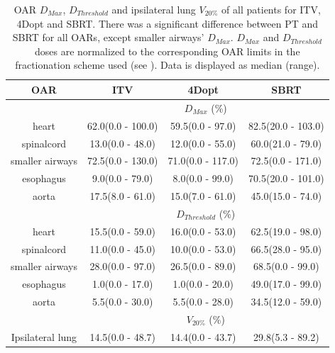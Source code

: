 \begin{table}[H]
	\centering
	\caption{OAR $D_{Max}$, $D_{Threshold}$ and ipsilateral lung $V_{20\%}$ of all patients for ITV, 4Dopt and SBRT. There was a significant difference between PT and SBRT for all OARs, except
	smaller airways' $D_{Max}$. $D_{Max}$ and $D_{Threshold}$ doses are normalized to the corresponding OAR limits in the fractionation scheme used (see \cite{Benedict2010}). 
	Data is displayed as median (range).}
	\begin{tabular}{c|c|c|c}
		\hline\hline
		 
		OAR &  ITV & 4Dopt & SBRT \\
		\hline
		& \multicolumn{3}{c}{$D_{Max}$ (\%)}  \\
		\hline
heart        & 62.0(0.0 - 100.0) & 59.5(0.0 - 97.0) & 82.5(20.0 - 103.0)\\ 
spinalcord    & 13.0(0.0 - 48.0) & 12.0(0.0 - 55.0) & 60.0(21.0 - 79.0)\\ 
smaller airways & 72.5(0.0 - 130.0) & 71.0(0.0 - 117.0) & 72.5(0.0 - 171.0)\\ 
esophagus      & 9.0(0.0 - 79.0) & 8.0(0.0 - 99.0) & 70.5(20.0 - 101.0)\\ 
aorta         & 17.5(8.0 - 61.0) & 15.0(7.0 - 61.0) & 45.0(15.0 - 74.0)\\ 
\hline\hline
& \multicolumn{3}{c}{$D_{Threshold}$ (\%)} \\
\hline
heart & 15.5(0.0 - 59.0) & 16.0(0.0 - 53.0) & 62.5(19.0 - 98.0)\\ 
spinalcord & 11.0(0.0 - 45.0) & 10.0(0.0 - 53.0) & 66.5(28.0 - 95.0)\\ 
smaller airways & 28.0(0.0 - 97.0) & 26.5(0.0 - 89.0) & 68.5(0.0 - 99.0)\\ 
esophagus & 1.0(0.0 - 17.0) & 1.0(0.0 - 20.0) & 49.0(17.0 - 99.0)\\ 
aorta & 5.5(0.0 - 30.0) & 5.5(0.0 - 28.0) & 34.5(12.0 - 59.0)\\ 
\hline\hline
& \multicolumn{3}{c}{$V_{20\%}$ (\%)} \\
\hline
Ipsilateral lung & 14.5(0.0 - 48.7) & 14.4(0.0 - 43.7) & 29.8(5.3 - 89.2)\\ 
\hline\hline
	\end{tabular}
	\label{tab:OARComplex}
\end{table}

